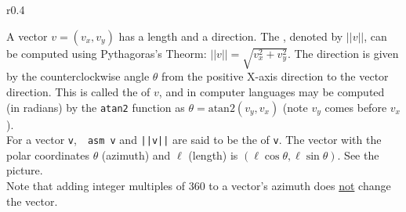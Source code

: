 \documentclass[12pt]{article}
\begin{document}
\begin{minipage}{\textwidth}\raggedright
\begin{wrapfigure}{r}{0.4\textwidth}
\end{wrapfigure}
A vector $v=(v_x,v_y)$ has a length and a direction.
The , denoted by $||v||$, can be computed using
Pythagoras's Theorm: $||v||=\sqrt{v_x^2+v_y^2}$.  The
direction is given by the counterclockwise angle $\theta$ from
the positive X-axis direction to the vector direction.
This is called the  of $v$, and in computer
languages may be computed (in radians) by the {\tt atan2} function as
$\theta = \mathrm{atan2}(v_y,v_x)$ (note $v_y$ comes before $v_x$).
\\[1ex]
For a vector {\tt v},~~{\tt asm v} and {\tt ||v||} are said to be
the  of {\tt v}.
The vector with the polar coordinates $\theta$ (azimuth) and $\ell$ (length) is
$(\ell \cos\theta,\ell \sin\theta)$.
See the picture.
\\[1ex]
Note that adding integer multiples of 360 to a vector's
azimuth does \underline{not} change the vector.
\end{minipage}

\newpage
\end{document}
